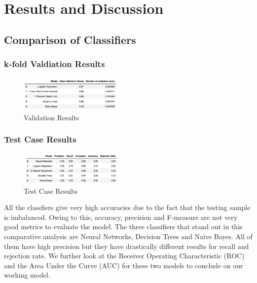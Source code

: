 \documentclass[conference]{IEEEtran}
\begin{document}
\section{Results and Discussion}
\subsection{\textbf{Comparison of Classifiers}}

\subsubsection{\textbf{k-fold Valdiation Results}}
\begin{center}
\begin{figure}[h]
\includegraphics[width=0.45\textwidth]{validation.png}
\caption{Validation Results}
\label{fig:mesh1}
\end{figure}
\end{center}

\subsubsection{\textbf{Test Case Results}}
\begin{center}
\begin{figure}[h]
\includegraphics[width=0.45\textwidth]{test.png}
\caption{Test Case Results}
\label{fig:mesh1}
\end{figure}
\end{center}
All the classfiers give very high accuracies due to the fact that the testing sample is imbalanced. Owing to this, accuracy, precision and F-measure are not very good metrics to evaluate the model.
The three classifiers that stand out in this comparative analysis are Neural Networks, Decision Trees and Naive Bayes. All of them have high precision but they have drastically different results for recall and rejection rate. We further look at the Receiver Operating Characteristic (ROC) and the Area Under the Curve (AUC) for these two models to conclude on our working model. 
\\
\end{document}
